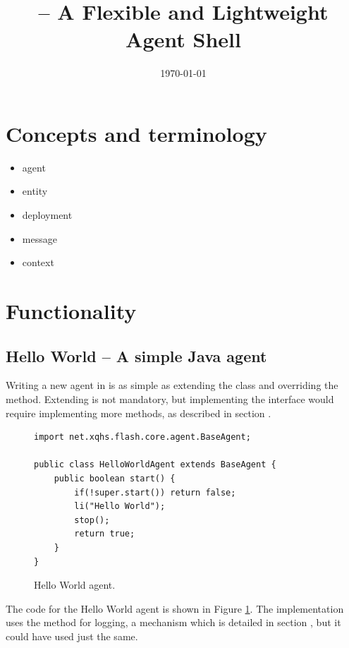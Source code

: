 \documentclass{article}
\title{\fmas -- A Flexible and Lightweight \\ Agent Shell}
\author{}
\date{\today}
\begin{document}
\maketitle

\tableofcontents\clearpage

\section{Concepts and terminology}
\begin{itemize}
    \item agent
    \item entity
    \item deployment
    \item message
    \item context
\end{itemize}

\section{Functionality}

\clearpage
\subsection{Hello World -- A simple Java agent}

Writing a new agent in \fmas is as simple as extending the  class and overriding the  method. Extending  is not mandatory, but implementing the  interface would require implementing more methods, as described in section .

\begin{figure}[ht]\centering
\begin{lstlisting}
import net.xqhs.flash.core.agent.BaseAgent;

public class HelloWorldAgent extends BaseAgent {
	public boolean start() {
		if(!super.start()) return false;
		li("Hello World");
		stop();
		return true;
	}
}
\end{lstlisting}
\caption{Hello World agent.}\label{fig:func:helloWorld:code}
\end{figure}

The code for the Hello World agent is shown in Figure \ref{fig:func:helloWorld:code}. The implementation uses the  method for logging, a mechanism which is detailed in section , but it could have used  just the same.
\end{document}
